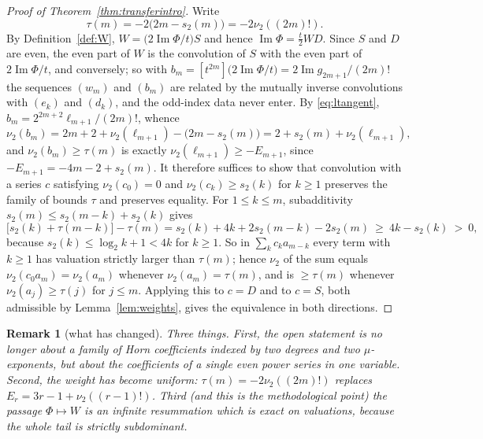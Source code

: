 \documentclass[10pt,a4paper]{amsart}
\newtheorem{remark}[theorem]{Remark}
\begin{document}
\begin{proof}[Proof of Theorem~\ref{thm:transferintro}]
Write 
\[
\tau(m)=-2\bigl(2m-s_2(m)\bigr)=-2\nu_2((2m)!).  
\]
By Definition~\ref{def:W}, $W=\bigl(2\operatorname{Im}\Phi/t\bigr)S$ and hence $\operatorname{Im}\Phi=\frac t2WD$.  Since $S$ and $D$ are even, the even part of $W$ is the convolution of $S$ with the even part of $2\operatorname{Im}\Phi/t$, and conversely; so with
$b_m=[t^{2m}]\bigl(2\operatorname{Im}\Phi/t\bigr) =2\operatorname{Im}g_{2m+1}/(2m)!$ the sequences $(w_m)$ and $(b_m)$ are related by the mutually inverse convolutions with $(e_k)$ and $(d_k)$, and the odd-index data never enter.  By \eqref{eq:ltangent}, $b_m=2^{2m+2}\ell_{m+1}/(2m)!$, whence
\[
  \nu_2(b_m)=2m+2+\nu_2(\ell_{m+1})-\bigl(2m-s_2(m)\bigr)            =2+s_2(m)+\nu_2(\ell_{m+1}),
\]
and $\nu_2(b_m)\ge\tau(m)$ is exactly $\nu_2(\ell_{m+1})\ge-E_{m+1}$, since $-E_{m+1}=-4m-2+s_2(m)$.  It therefore suffices to show that convolution with a series $c$ satisfying $\nu_2(c_0)=0$ and $\nu_2(c_k)\ge s_2(k)$ for $k\ge1$ preserves the family of bounds $\tau$ and preserves equality.  For $1\le k\le m$, subadditivity $s_2(m)\le s_2(m-k)+s_2(k)$ gives
\[
  \bigl[s_2(k)+\tau(m-k)\bigr]-\tau(m)  =s_2(k)+4k+2s_2(m-k)-2s_2(m)\ \ge\ 4k-s_2(k)\ >\ 0,
\]
because $s_2(k)\le\log_2k+1<4k$ for $k\ge1$.  So in $\sum_kc_ka_{m-k}$ every term with $k\ge1$ has valuation strictly larger than $\tau(m)$; hence $\nu_2$ of the sum equals $\nu_2(c_0a_m)=\nu_2(a_m)$ whenever $\nu_2(a_m)=\tau(m)$, and is $\ge\tau(m)$ whenever $\nu_2(a_j)\ge\tau(j)$ for $j\le m$.  Applying this to $c=D$ and to $c=S$, both admissible by Lemma~\ref{lem:weights}, gives the equivalence in both directions.
\end{proof}


\begin{remark}[what has changed]
Three things.  First, the open statement is no longer about a family of Horn coefficients indexed by two degrees and two $\mu$-exponents, but about the coefficients of a \emph{single} even power series in one variable.  Second, the weight has become uniform: $\tau(m)=-2\nu_2((2m)!)$ replaces $E_r=3r-1+\nu_2((r-1)!)$.  Third (and this is the methodological point) the passage $\Phi\mapsto W$ is an infinite resummation which is exact on valuations, because the whole tail is strictly subdominant.
\end{remark}
\end{document}
